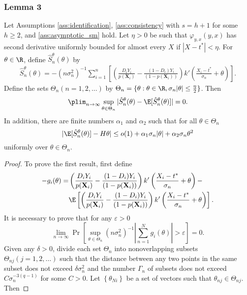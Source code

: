 {\subsubsection*{Lemma 3}
    \begin{lem}\label{lemma3}
       Let Assumptions \ref{ass:identification}, \ref{ass:consistency} with $s=h + 1$ for some $h\geq 2$, and \ref{ass:asymptotic_sm} hold. Let $\eta > 0$ be such that $\varphi_{y,x}(y,x)$ has second derivative uniformly bounded for almost every $X$ if $|X-t^*|<\eta$. For $\theta\in \R$, define $\hat{S}^\theta_n(\theta)$ by
        \begin{gather}
            \hat{S}^\theta_n(\theta) = -(n \sigma_n^2)^{-1} \sum_{i=1}^n \left[\left(\frac{D_i Y_i}{p(\textbf{X}_i)} - \frac{(1-D_i) Y_i}{(1-p(\textbf{X}_i))} \right) k'\left(\frac{X_i - t^*}{\sigma_n} + \theta \right) \right].
        \end{gather}
        Define the sets $\Theta_n(n=1,2,\dots)$ by $\Theta_n = \{\theta: \theta \in \R, \sigma_n |\theta| \leq \frac{\eta}{2}\}$.
        Then
        \begin{gather}
            \plim_{n \rightarrow \infty}  \sup_{\theta\in \Theta_n} |\hat{S}^\theta_n(\theta) - \E[\hat{S}^\theta_n(\theta)]| = 0.
        \end{gather}
        In addition, there are finite numbers $\alpha_1$ and $\alpha_2$ such that for all $\theta \in \Theta_n$
        $$|\E[\hat{S}^\theta_n(\theta)] - H \theta| \leq o(1) + \alpha_1 \sigma_n |\theta| + \alpha_2 \sigma_n \theta^2 $$
        uniformly over $\theta \in \Theta_n$.
    \end{lem}
    \begin{proof}
        To prove the first result, first define 
        \begin{align}
            -g_i(\theta) =& \left(\frac{D_i Y_i}{p(\textbf{X}_i)} - \frac{(1-D_i) Y_i}{(1-p(\textbf{X}_i))} \right) k'\left(\frac{X_i - t^*}{\sigma_n} + \theta \right) - \\
            & \E \left[ \left(\frac{D_i Y_i}{p(\textbf{X}_i)} - \frac{(1-D_i) Y_i}{(1-p(\textbf{X}_i))} \right) k'\left(\frac{X_i - t^*}{\sigma_n} + \theta \right) \right].
        \end{align}
        It is necessary to prove that for any $\varepsilon>0$
        $$
        \lim _{n \rightarrow \infty} \operatorname{Pr}\left[\sup _{\theta \in \Theta_n}\left(n \sigma_n^2\right)^{-1}\left|\sum_{n=1}^N g_{i}(\theta)\right|>\varepsilon\right]=0 .
        $$
        Given any $\delta>0$, divide each set $\Theta_n$ into nonoverlapping subsets $\Theta_{n j}(j=1,2, \ldots)$ such that the distance between any two points in the same subset does not exceed $\delta \sigma_n^2$ and the number $\Gamma_n$ of subsets does not exceed $C \sigma_n^{-3(q-1)}$ for some $C>0$. Let $\left\{\theta_{N i}\right\}$ be a set of vectors such that $\theta_{nj} \in \Theta_{nj}$. Then

\end{proof}}
